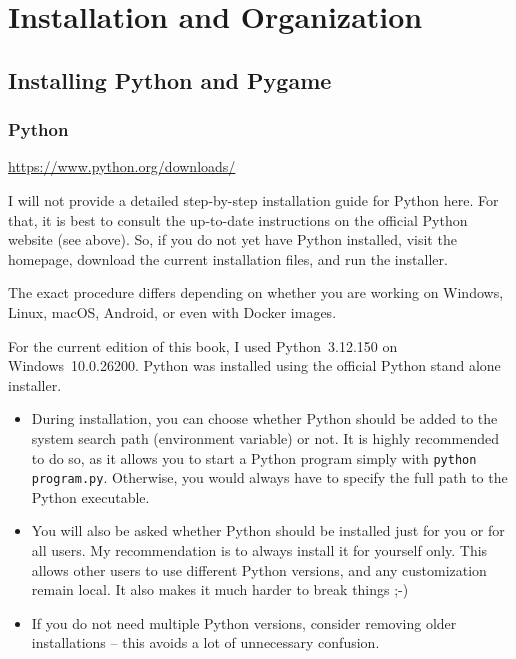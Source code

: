 
\setcounter{section}{-1}
\section{Installation and Organization}
\subsection{Installing Python and Pygame}

\subsubsection{Python}
\begin{diskbox}
	\url{https://www.python.org/downloads/}
\end{diskbox}

I will not provide a detailed step-by-step installation guide for Python here. For that, it is best to consult the up-to-date instructions on the official Python website (see above). So, if you do not yet have Python installed, visit the homepage, download the current installation files, and run the installer.

The exact procedure differs depending on whether you are working on Windows, Linux, macOS, Android, or even with Docker images.

For the current edition of this book, I used Python~{3.12.150} on Windows~{10.0.26200}. Python was installed using the official Python stand alone installer.

\begin{warningbox}
	\begin{itemize}
		\item During installation, you can choose whether Python should be added to the system search path (environment variable) or not. It is highly recommended to do so, as it allows you to start a Python program simply with \texttt{python program.py}. Otherwise, you would always have to specify the full path to the Python executable.

		\item You will also be asked whether Python should be installed just for you or for all users. My recommendation is to always install it for yourself only. This allows other users to use different Python versions, and any customization remain local. It also makes it much harder to break things ;-)

		\item If you do not need multiple Python versions, consider removing older installations -- this avoids a lot of unnecessary confusion.	
	\end{itemize}
\end{warningbox}

